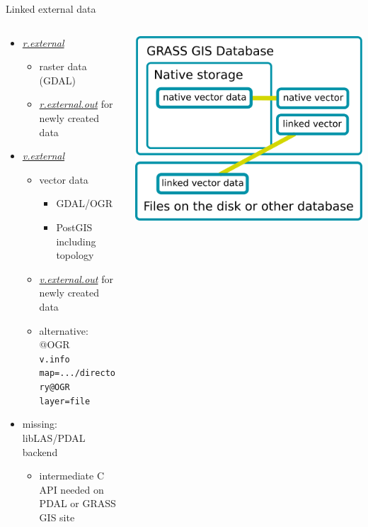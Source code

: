 \documentclass[xcolor={dvipsnames,usenames},beamer,aspectratio=169]{beamer}
\newcommand{\gmodule}[1]{\href{http://grass.osgeo.org/grass71/manuals/#1.html}{\emph{#1}}}
\begin{document}
\begin{frame}{Linked external data}

\begin{columns}
\begin{column}{0.45\textwidth}

\begin{itemize}
  \item \gmodule{r.external}
  \begin{itemize}
    \item raster data (GDAL)
    \item \gmodule{r.external.out} for newly created data
  \end{itemize}
  \item \gmodule{v.external}
  \begin{itemize}
    \item vector data
    \begin{itemize}
      \item GDAL/OGR
      \item PostGIS including topology
    \end{itemize}
    \item \gmodule{v.external.out} for newly created data
    \item alternative: @OGR
      \\\tiny\texttt{v.info map=.../directory@OGR layer=file}
  \end{itemize}
  \item missing: libLAS/PDAL backend
  \begin{itemize}
    \item intermediate C API needed on PDAL or GRASS GIS site
  \end{itemize}
\end{itemize}

\end{column}
\begin{column}{0.5\textwidth}

\begin{center}
\includegraphics[width=\textwidth]{features/external_data}
\end{center}


\end{column}
\end{columns}
\end{frame}
\end{document}
